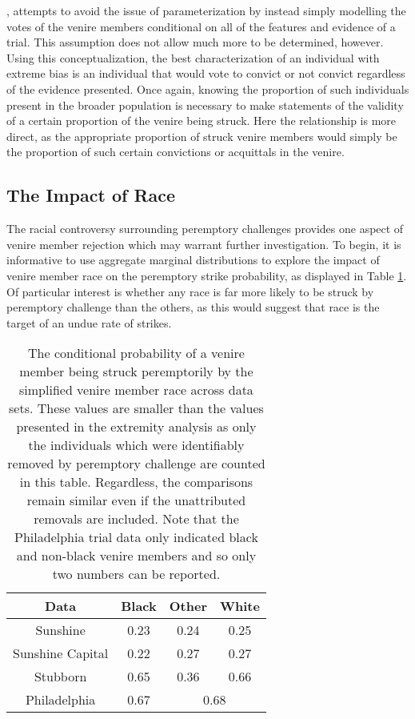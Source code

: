 \cite{flanagan2015}, attempts to avoid the issue of parameterization by instead simply modelling the votes of the venire
members conditional on all of the features and evidence of a trial. This assumption does not allow much more to be determined, however. Using this conceptualization, the best
characterization of an individual with extreme bias is an individual that would vote to convict or not convict regardless of the
evidence presented. Once again, knowing the proportion of such individuals present in the broader population is necessary to make
statements of the validity of a certain proportion of the venire being struck. Here the relationship is more direct, as the
appropriate proportion of struck venire members would simply be the proportion of such certain convictions or acquittals in the
venire.

\subsection{The Impact of Race} \label{sec:impactrace} 

The racial controversy surrounding peremptory challenges provides one aspect of venire member rejection
which may warrant further investigation. To begin, it is informative to use aggregate marginal distributions to explore the impact of venire member race on the peremptory strike probability, as displayed in Table 
\ref{tab:margrace}. Of particular interest is whether any race is far more likely to be struck by peremptory challenge than the
others, as this would suggest that race is the target of an undue rate of strikes.

\begin{table}[h!]
  \centering
  \caption[Strike Rate by Race]{\footnotesize The conditional probability of a venire member being struck peremptorily by the
    simplified venire member race across data sets. These values are smaller than the values presented in the extremity analysis
    as only the individuals which were identifiably removed by peremptory challenge are counted in this table. Regardless, the
    comparisons remain similar even if the unattributed removals are included. Note that the Philadelphia trial data only
    indicated black and non-black venire members and so only two numbers can be reported.} \label{tab:margrace}
  \begin{tabular}{|c|c c c|} \hline
    Data & Black & Other & White \\ \hline
    Sunshine & 0.23 & 0.24 & 0.25 \\
    Sunshine Capital & 0.22 & 0.27 & 0.27 \\
    Stubborn & 0.65 & 0.36 & 0.66 \\ 
    Philadelphia & 0.67 & \multicolumn{2}{c|}{0.68} \\ \hline
  \end{tabular}
\end{table}

